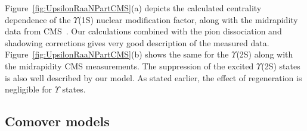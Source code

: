 {Figure~\ref{fig:UpsilonRaaNPartCMS}(a) depicts the calculated 
centrality dependence of the $\Upsilon$(1S) nuclear
modification factor, along with the midrapidity data from CMS~\cite{Sirunyan:2018nsz}.
Our calculations combined with the pion dissociation and shadowing corrections 
gives very good description of the measured data. Figure~\ref{fig:UpsilonRaaNPartCMS}(b)
shows the same for the $\Upsilon$(2S) along with the midrapidity
CMS measurements. The suppression of the excited $\Upsilon$(2S) states 
is also well described by our model. As stated earlier, the effect of regeneration is
negligible for $\Upsilon$ states. 




\subsection{Comover models}

}
